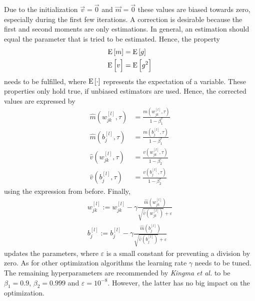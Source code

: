 Due to the initialization $\vec{v} = \vec{0}$ and $\vec{m} = \vec{0}$ these values are biased towards zero, especially during the first few iterations.
A correction is desirable because the first and second moments are only estimations.
In general, an estimation should equal the parameter that is tried to be estimated.
Hence, the property
\begin{subequations}
	\begin{align}
		\operatorname{\mathrm{E}}\left[m\right] &= \operatorname{\mathrm{E}}\left[g\right]\\
		\operatorname{\mathrm{E}}\left[v\vphantom{g^2}\right] &= \operatorname{\mathrm{E}}\left[g^2\right]
	\end{align}
\end{subequations}
needs to be fulfilled, where $\operatorname{\mathrm{E}}\left[\cdot\right]$ represents the expectation of a variable.
These properties only hold true, if unbiased estimators are used.
Hence, the corrected values are expressed by
\begin{subequations}
	\label{eq:adam-corrected}
	\begin{align}
	\hat{m}(w^{[l]}_{jk}, \tau) &= \frac{m(w^{[l]}_{jk},\tau)}{1-\beta_1^\tau} \\
	\hat{m}(b^{[l]}_{j}, \tau) &= \frac{m(b^{[l]}_{j},\tau)}{1-\beta_1^\tau} \\
	\hat{v}(w^{[l]}_{jk}, \tau) &= \frac{v(w^{[l]}_{jk}, \tau)}{1-\beta_2^\tau} \\
	\hat{v}(b^{[l]}_{j}, \tau) &= \frac{v(b^{[l]}_{j}, \tau)}{1-\beta_2^\tau}
	\end{align}
\end{subequations}
using the expression from before.
Finally,
\begin{subequations}
	\label{eq:adam-update}
	\begin{align}
		w^{[l]}_{jk} := w^{[l]}_{jk}-\gamma \frac{\hat{m}(w^{[l]}_{jk})}{\sqrt{\hat{v}(w^{[l]}_{jk})} + \varepsilon} \\
		b^{[l]}_{j} := b^{[l]}_{j}-\gamma \frac{\hat{m}(b^{[l]}_{j})}{\sqrt{\hat{v}(b^{[l]}_{j})} + \varepsilon}
	\end{align}
\end{subequations}
updates the parameters, where $\varepsilon$ is a small constant for preventing a division by zero.
As for other optimization algorithms the learning rate $\gamma$ needs to be tuned.
The remaining hyperparameters are recommended by \textit{Kingma et al.} to be $\beta_1 = 0.9$, $\beta_2 = 0.999$ and $\varepsilon = 10^{-8}$.
However, the latter has no big impact on the optimization.